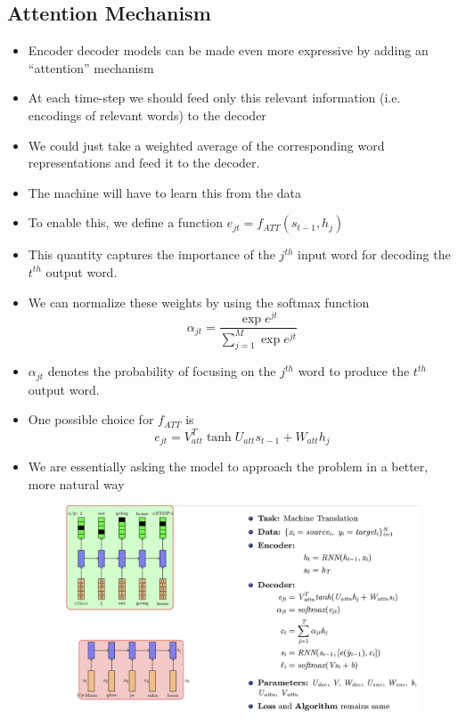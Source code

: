 \documentclass[a4paper]{article}
\begin{document}
\subsection{Attention Mechanism}
\begin{itemize}
    \item Encoder decoder models can be made even more expressive by adding an “attention” mechanism
    \item At each time-step we should feed only this relevant information (i.e. encodings of relevant words) to the decoder
    \item We could just take a weighted average of the corresponding word representations and feed it to the decoder.
    \item The machine will have to learn this from the data
    \item To enable this, we define a function $e_{jt} = f_{ATT}(s_{t-1}, h_j)$
    \item This quantity captures the importance of the $j^{th}$ input word for decoding the $t^{th}$ output word.
    \item We can normalize these weights by using the softmax function
    \begin{equation*}
        \alpha_{jt}=\frac{\exp{e^{jt}}}{\sum_{j=1}^M\exp{e^{jt}}}
    \end{equation*}
    \item $\alpha_{jt}$ denotes the probability of focusing on the $j^{th}$ word to produce the $t^{th}$ output word.
    \item One possible choice for $f_{ATT}$ is
    \begin{equation*}
        e_{jt}=V_{att}^T\tanh{U_{att}s_{t-1}+W_{att}h_j}
    \end{equation*}
    \item We are essentially asking the model to approach the problem in a better, more natural way
    \begin{figure}[H]
        \centering
        \includegraphics[width=0.8\linewidth]{Degree//static/DL_machine_translation_attention.png}

\end{figure}
\end{itemize}
\end{document}

